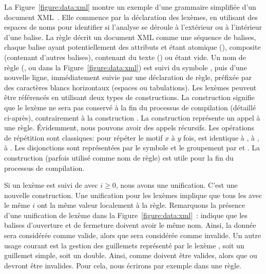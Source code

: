 La Figure~\ref{figure:data:xml} montre un exemple d'une grammaire simplifiée
d'un document XML~. Elle commence par la déclaration des lexèmes, en
utilisant des espaces de noms pour identifier si l'analyse se déroule à
l'extérieur ou à l'intérieur d'une balise. La règle  décrit un
document XML comme une séquence de balises, chaque balise ayant potentiellement
des attributs et étant atomique (), composite (contenant d'autres
balises), contenant du texte () ou étant vide. Un
nom de règle (,  ou  dans la
Figure~\ref{figure:data:xml}) est suivi du symbole \code{:}, puis d'une nouvelle
ligne, immédiatement suivie par une {\strong déclaration de règle}, préfixée par
des caractères blancs horizontaux (espaces ou tabulations). Les lexèmes peuvent
être référencés en utilisant deux types de constructions. La construction
 signifie que le lexème ne sera pas conservé à la fin du
processus de compilation (détaillé ci-après), contrairement à la construction
. La construction  représente un appel à une règle.
Évidemment, nous pouvons avoir des appels récursifs. Les opérations de
répétition sont classiques:  pour répéter le motif $x$ à $y$
fois,  est identique à , \code{+} à ,
\code{*} à . Les disjonctions sont représentées par le symbole
\code{\mvert} et le groupement par \code{(} et \code{)}. La construction
 (parfois utilisé comme nom de règle) est utile pour la fin du
processus de compilation.

Si un lexème est suivi de \code{[$i$]} avec $i \geq 0$, nous avons une
unification. C'est une nouvelle construction. Une unification pour les lexèmes
implique que tous les  avec le même $i$ ont la même valeur
localement à la règle.  Remarquons la présence d'une unification de lexème dans
la Figure~\ref{figure:data:xml}~:  indique que les balises
d'ouverture et de fermeture doivent avoir le même nom. Ainsi, la donnée
 sera considérée comme valide, alors que 
sera considérée comme invalide. Un autre usage courant est la gestion des
guillemets représenté par le lexème , soit un guillemet simple, soit
un double. Ainsi,  comme  doivent être valides, alors que
 ou  devront être invalides. Pour cela, nous écrirons par
exemple  dans une règle.

